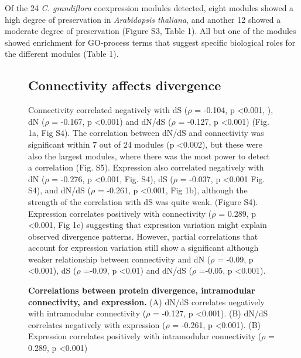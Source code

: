 Of the 24 \textit{C. grandiflora} coexpression modules detected, eight modules showed a high degree of preservation in \textit{Arabidopsis thaliana}, and another 12 showed a moderate degree of preservation (Figure S3, Table 1). All but one of the modules showed enrichment for GO-process terms that suggest specific biological roles for the different modules (Table 1).

\begin{figure}[ht!]
\centering
\includgraphics[scale=0.8][Ch4Fig1]
\caption{\textbf{Correlations between protein divergence, intramodular connectivity, and expression.} (A) dN/dS correlates negatively with intramodular connectivity ($\rho$ = -0.127, p \textless 0.001). (B) dN/dS correlates negatively with expression ($\rho$ = -0.261, p \textless 0.001). (B) Expression correlates positively with intramodular connectivity ($\rho$ = 0.289, p \textless 0.001)}

\subsection{Connectivity affects divergence}
Connectivity correlated negatively with dS ($\rho$ = -0.104, p \textless 0.001, ), dN ($\rho$ = -0.167, p \textless 0.001) and dN/dS ($\rho$ = -0.127, p \textless 0.001) (Fig. 1a, Fig S4). The correlation between dN/dS and connectivity was significant within 7 out of 24 modules (p \textless 0.002), but these were also the largest modules, where there was the most power to detect a correlation (Fig. S5). Expression also correlated negatively with dN ($\rho$ = -0.276, p \textless 0.001, Fig. S4), dS ($\rho$ = -0.037, p \textless 0.001 Fig. S4), and dN/dS ($\rho$ = -0.261, p \textless 0.001, Fig 1b),  although the strength of the correlation with dS was quite weak. (Figure S4). Expression correlates positively with connectivity ($\rho$ = 0.289, p \textless 0.001, Fig 1c) suggesting that expression variation might explain observed divergence patterns. However, partial correlations that account for expression variation still show a significant although weaker relationship between connectivity and dN ($\rho$ = -0.09, p \textless 0.001), dS ($\rho$ =-0.09, p \textless 0.01) and dN/dS ($\rho$ =-0.05, p \textless 0.001). 


\end{figure}

